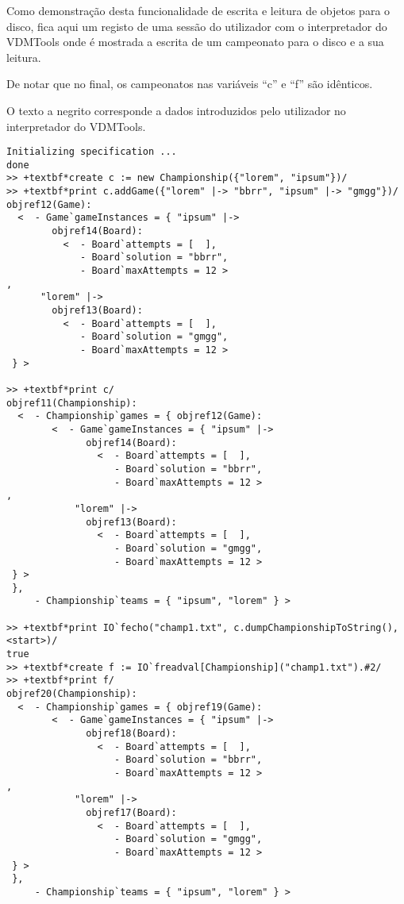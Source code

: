 Como demonstração desta funcionalidade de escrita e leitura de objetos
para o disco, fica aqui um registo de uma sessão do utilizador com o
interpretador do VDMTools onde é mostrada a escrita de um campeonato
para o disco e a sua leitura.

De notar que no final, os campeonatos nas variáveis ``c'' e ``f'' são
idênticos.

O texto a negrito corresponde a dados introduzidos pelo utilizador no
interpretador do VDMTools.

\begin{Verbatim}[commandchars=+*/]
Initializing specification ... 
done
>> +textbf*create c := new Championship({"lorem", "ipsum"})/
>> +textbf*print c.addGame({"lorem" |-> "bbrr", "ipsum" |-> "gmgg"})/
objref12(Game):
  <  - Game`gameInstances = { "ipsum" |-> 
        objref14(Board):
          <  - Board`attempts = [  ],
             - Board`solution = "bbrr",
             - Board`maxAttempts = 12 >
,
      "lorem" |-> 
        objref13(Board):
          <  - Board`attempts = [  ],
             - Board`solution = "gmgg",
             - Board`maxAttempts = 12 >
 } >

>> +textbf*print c/
objref11(Championship):
  <  - Championship`games = { objref12(Game):
        <  - Game`gameInstances = { "ipsum" |-> 
              objref14(Board):
                <  - Board`attempts = [  ],
                   - Board`solution = "bbrr",
                   - Board`maxAttempts = 12 >
,
            "lorem" |-> 
              objref13(Board):
                <  - Board`attempts = [  ],
                   - Board`solution = "gmgg",
                   - Board`maxAttempts = 12 >
 } >
 },
     - Championship`teams = { "ipsum", "lorem" } >

>> +textbf*print IO`fecho("champ1.txt", c.dumpChampionshipToString(), <start>)/
true
>> +textbf*create f := IO`freadval[Championship]("champ1.txt").#2/
>> +textbf*print f/
objref20(Championship):
  <  - Championship`games = { objref19(Game):
        <  - Game`gameInstances = { "ipsum" |-> 
              objref18(Board):
                <  - Board`attempts = [  ],
                   - Board`solution = "bbrr",
                   - Board`maxAttempts = 12 >
,
            "lorem" |-> 
              objref17(Board):
                <  - Board`attempts = [  ],
                   - Board`solution = "gmgg",
                   - Board`maxAttempts = 12 >
 } >
 },
     - Championship`teams = { "ipsum", "lorem" } >
\end{Verbatim}



